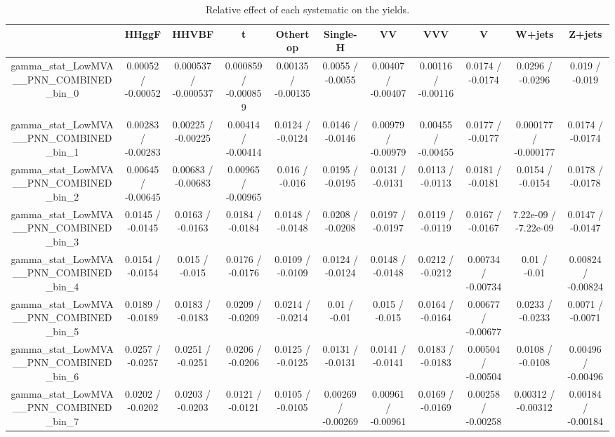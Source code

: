 \documentclass[10pt]{article}
\begin{document}
\begin{table}[htbp]
\begin{center}
\begin{tabular}{|c|c|c|c|c|c|c|c|c|c|c|}
\hline 
      & HHggF      & HHVBF      & t      & Othertop      & Single-H      & VV      & VVV      & V      & W+jets      & Z+jets \\ 
\hline 
  gamma_stat_LowMVA__PNN_COMBINED_bin_0 & 0.00052 / -0.00052 & 0.000537 / -0.000537 & 0.000859 / -0.000859 & 0.00135 / -0.00135 & 0.0055 / -0.0055 & 0.00407 / -0.00407 & 0.00116 / -0.00116 & 0.0174 / -0.0174 & 0.0296 / -0.0296 & 0.019 / -0.019 \\ 
  gamma_stat_LowMVA__PNN_COMBINED_bin_1 & 0.00283 / -0.00283 & 0.00225 / -0.00225 & 0.00414 / -0.00414 & 0.0124 / -0.0124 & 0.0146 / -0.0146 & 0.00979 / -0.00979 & 0.00455 / -0.00455 & 0.0177 / -0.0177 & 0.000177 / -0.000177 & 0.0174 / -0.0174 \\ 
  gamma_stat_LowMVA__PNN_COMBINED_bin_2 & 0.00645 / -0.00645 & 0.00683 / -0.00683 & 0.00965 / -0.00965 & 0.016 / -0.016 & 0.0195 / -0.0195 & 0.0131 / -0.0131 & 0.0113 / -0.0113 & 0.0181 / -0.0181 & 0.0154 / -0.0154 & 0.0178 / -0.0178 \\ 
  gamma_stat_LowMVA__PNN_COMBINED_bin_3 & 0.0145 / -0.0145 & 0.0163 / -0.0163 & 0.0184 / -0.0184 & 0.0148 / -0.0148 & 0.0208 / -0.0208 & 0.0197 / -0.0197 & 0.0119 / -0.0119 & 0.0167 / -0.0167 & 7.22e-09 / -7.22e-09 & 0.0147 / -0.0147 \\ 
  gamma_stat_LowMVA__PNN_COMBINED_bin_4 & 0.0154 / -0.0154 & 0.015 / -0.015 & 0.0176 / -0.0176 & 0.0109 / -0.0109 & 0.0124 / -0.0124 & 0.0148 / -0.0148 & 0.0212 / -0.0212 & 0.00734 / -0.00734 & 0.01 / -0.01 & 0.00824 / -0.00824 \\ 
  gamma_stat_LowMVA__PNN_COMBINED_bin_5 & 0.0189 / -0.0189 & 0.0183 / -0.0183 & 0.0209 / -0.0209 & 0.0214 / -0.0214 & 0.01 / -0.01 & 0.015 / -0.015 & 0.0164 / -0.0164 & 0.00677 / -0.00677 & 0.0233 / -0.0233 & 0.0071 / -0.0071 \\ 
  gamma_stat_LowMVA__PNN_COMBINED_bin_6 & 0.0257 / -0.0257 & 0.0251 / -0.0251 & 0.0206 / -0.0206 & 0.0125 / -0.0125 & 0.0131 / -0.0131 & 0.0141 / -0.0141 & 0.0183 / -0.0183 & 0.00504 / -0.00504 & 0.0108 / -0.0108 & 0.00496 / -0.00496 \\ 
  gamma_stat_LowMVA__PNN_COMBINED_bin_7 & 0.0202 / -0.0202 & 0.0203 / -0.0203 & 0.0121 / -0.0121 & 0.0105 / -0.0105 & 0.00269 / -0.00269 & 0.00961 / -0.00961 & 0.0169 / -0.0169 & 0.00258 / -0.00258 & 0.00312 / -0.00312 & 0.00184 / -0.00184 \\ 
\hline 
\end{tabular} 
\caption{Relative effect of each systematic on the yields.} 
\end{center} 
\end{table} 
\end{document}

